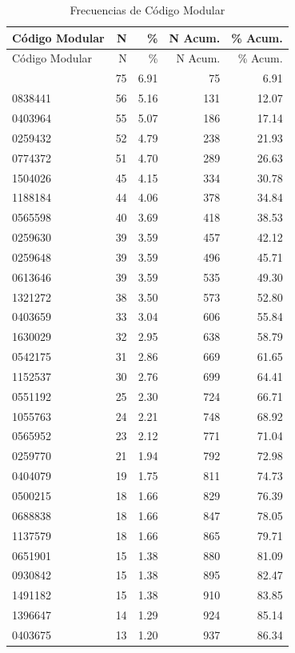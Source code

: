 \documentclass[
]{article}
\begin{document}
\begin{longtable}[]{@{}lrrrr@{}}
\caption{Frecuencias de Código Modular}\tabularnewline
\toprule\noalign{}
Código Modular & N & \% & N Acum. & \% Acum. \\
\midrule\noalign{}
\endfirsthead
\toprule\noalign{}
Código Modular & N & \% & N Acum. & \% Acum. \\
\midrule\noalign{}
\endhead
\bottomrule\noalign{}
\endlastfoot
0335422 & 75 & 6.91 & 75 & 6.91 \\
0838441 & 56 & 5.16 & 131 & 12.07 \\
0403964 & 55 & 5.07 & 186 & 17.14 \\
0259432 & 52 & 4.79 & 238 & 21.93 \\
0774372 & 51 & 4.70 & 289 & 26.63 \\
1504026 & 45 & 4.15 & 334 & 30.78 \\
1188184 & 44 & 4.06 & 378 & 34.84 \\
0565598 & 40 & 3.69 & 418 & 38.53 \\
0259630 & 39 & 3.59 & 457 & 42.12 \\
0259648 & 39 & 3.59 & 496 & 45.71 \\
0613646 & 39 & 3.59 & 535 & 49.30 \\
1321272 & 38 & 3.50 & 573 & 52.80 \\
0403659 & 33 & 3.04 & 606 & 55.84 \\
1630029 & 32 & 2.95 & 638 & 58.79 \\
0542175 & 31 & 2.86 & 669 & 61.65 \\
1152537 & 30 & 2.76 & 699 & 64.41 \\
0551192 & 25 & 2.30 & 724 & 66.71 \\
1055763 & 24 & 2.21 & 748 & 68.92 \\
0565952 & 23 & 2.12 & 771 & 71.04 \\
0259770 & 21 & 1.94 & 792 & 72.98 \\
0404079 & 19 & 1.75 & 811 & 74.73 \\
0500215 & 18 & 1.66 & 829 & 76.39 \\
0688838 & 18 & 1.66 & 847 & 78.05 \\
1137579 & 18 & 1.66 & 865 & 79.71 \\
0651901 & 15 & 1.38 & 880 & 81.09 \\
0930842 & 15 & 1.38 & 895 & 82.47 \\
1491182 & 15 & 1.38 & 910 & 83.85 \\
1396647 & 14 & 1.29 & 924 & 85.14 \\
0403675 & 13 & 1.20 & 937 & 86.34 \\

\end{longtable}
\end{document}
